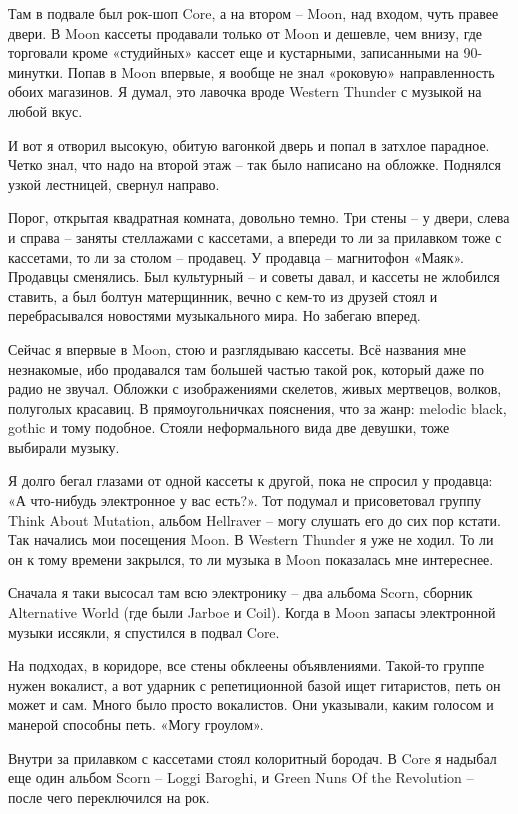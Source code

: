 Там в подвале был рок-шоп Core, а на втором – Moon, над входом, чуть правее двери. В Moon кассеты продавали только от Moon и дешевле, чем внизу, где торговали кроме «студийных» кассет еще и кустарными, записанными на 90-минутки. Попав в Moon впервые, я вообще не знал «роковую» направленность обоих магазинов. Я думал, это лавочка вроде Western Thunder с музыкой на любой вкус.

И вот я отворил высокую, обитую вагонкой дверь и попал в затхлое парадное. Четко знал, что надо на второй этаж – так было написано на обложке. Поднялся узкой лестницей, свернул направо.

Порог, открытая квадратная комната, довольно темно. Три стены – у двери, слева и справа – заняты стеллажами с кассетами, а впереди то ли за прилавком тоже с кассетами, то ли за столом – продавец. У продавца – магнитофон «Маяк». Продавцы сменялись. Был культурный – и советы давал, и кассеты не жлобился ставить, а был болтун матерщинник, вечно с кем-то из друзей стоял и перебрасывался новостями музыкального мира. Но забегаю вперед.

Сейчас я впервые в Moon, стою и разглядываю кассеты. Всё названия мне незнакомые, ибо продавался там большей частью такой рок, который даже по радио не звучал. Обложки с изображениями скелетов, живых мертвецов, волков, полуголых красавиц. В прямоугольничках пояснения, что за жанр: melodic black, gothic и тому подобное. Стояли неформального вида две девушки, тоже выбирали музыку.

Я долго бегал глазами от одной кассеты к другой, пока не спросил у продавца: «А что-нибудь электронное у вас есть?». Тот подумал и присоветовал группу Think About Mutation, альбом Hellraver – могу слушать его до сих пор кстати. Так начались мои посещения Moon. В Western Thunder я уже не ходил. То ли он к тому времени закрылся, то ли музыка в Moon показалась мне интереснее.

Сначала я таки высосал там всю электронику – два альбома Scorn, сборник Alternative World (где были Jarboe и Coil). Когда в Moon запасы электронной музыки иссякли, я спустился в подвал Core.

На подходах, в коридоре, все стены обклеены объявлениями. Такой-то группе нужен вокалист, а вот ударник с репетиционной базой ищет гитаристов, петь он может и сам. Много было просто вокалистов. Они указывали, каким голосом и манерой способны петь. «Могу гроулом».

Внутри за прилавком с кассетами стоял колоритный бородач. В Core я надыбал еще один альбом Scorn – Loggi Baroghi, и Green Nuns Of the Revolution – после чего переключился на рок.

